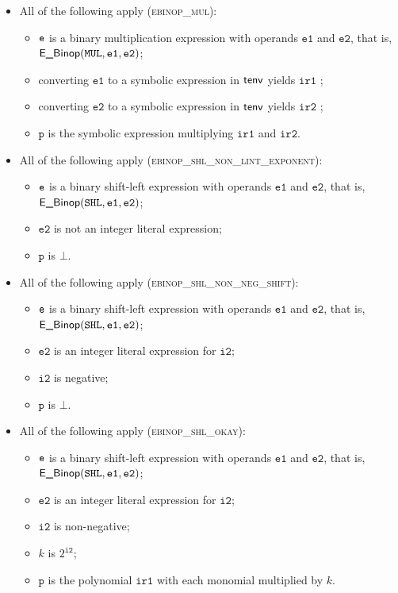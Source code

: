 \documentclass{book}
\newcommand\vitwo[0]{\texttt{i2}}
\newcommand\vp[0]{\texttt{p}}
\newcommand\veone[0]{\texttt{e1}}
\newcommand\vetwo[0]{\texttt{e2}}
\newcommand\irone[0]{\texttt{ir1}}
\newcommand\irtwo[0]{\texttt{ir2}}
\begin{document}
\begin{itemize}
  \item All of the following apply (\textsc{ebinop\_mul}):
  \begin{itemize}
    \item $\texttt{e}$ is a binary multiplication expression with operands $\veone$ and $\vetwo$, that is, \\ $\EBinop(\MUL, \veone, \vetwo)$;
    \item converting $\veone$ to a symbolic expression in $\textsf{tenv}$ yields $\irone$ \ProseOrTypeErrorOrBot;
    \item converting $\vetwo$ to a symbolic expression in $\textsf{tenv}$ yields $\irtwo$ \ProseOrTypeErrorOrBot;
    \item $\vp$ is the symbolic expression multiplying $\irone$ and $\irtwo$.
  \end{itemize}

  \item All of the following apply (\textsc{ebinop\_shl\_non\_lint\_exponent}):
  \begin{itemize}
    \item $\texttt{e}$ is a binary shift-left expression with operands $\veone$ and $\vetwo$, that is, \\ $\EBinop(\SHL, \veone, \vetwo)$;
    \item $\vetwo$ is not an integer literal expression;
    \item $\vp$ is $\bot$.
  \end{itemize}

  \item All of the following apply (\textsc{ebinop\_shl\_non\_neg\_shift}):
  \begin{itemize}
    \item $\texttt{e}$ is a binary shift-left expression with operands $\veone$ and $\vetwo$, that is, \\ $\EBinop(\SHL, \veone, \vetwo)$;
    \item $\vetwo$ is an integer literal expression for $\vitwo$;
    \item $\vitwo$ is negative;
    \item $\vp$ is $\bot$.
  \end{itemize}

  \item All of the following apply (\textsc{ebinop\_shl\_okay}):
  \begin{itemize}
    \item $\texttt{e}$ is a binary shift-left expression with operands $\veone$ and $\vetwo$, that is, \\ $\EBinop(\SHL, \veone, \vetwo)$;
    \item $\vetwo$ is an integer literal expression for $\vitwo$;
    \item $\vitwo$ is non-negative;
    \item $k$ is $2^{\vitwo}$;
    \item $\vp$ is the polynomial $\irone$ with each monomial multiplied by $k$.
  \end{itemize}


\end{itemize}
\end{document}

